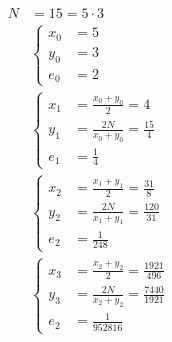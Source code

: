 \begin{align*}
	N
	&= 15 = 5 \cdot 3\\
	&\begin{cases}
		x_0 &= 5\\
		y_0 &= 3\\
		e_0 &= 2
	\end{cases}\\
	&\begin{cases}
		x_1 &= \frac{x_0 + y_0}{2} = 4\\
		y_1 &= \frac{2N}{x_0 + y_0} = \frac{15}{4}\\
		e_1 &= \frac{1}{4}
	\end{cases}\\
	&\begin{cases}
		x_2 &= \frac{x_1 + y_1}{2} = \frac{31}{8}\\
		y_2 &= \frac{2N}{x_1 + y_1} = \frac{120}{31}\\
		e_2 &= \frac{1}{248}
	\end{cases}\\
	&\begin{cases}
		x_3 &= \frac{x_2 + y_2}{2} = \frac{1921}{496}\\
		y_3 &= \frac{2N}{x_2 + y_2} = \frac{7440}{1921}\\
		e_2 &= \frac{1}{952816}
	\end{cases}
\end{align*}

